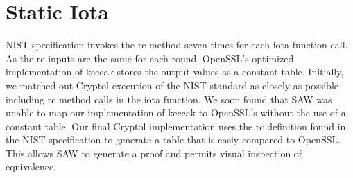 \section{Static Iota}\label{sec:iota}
NIST specification invokes the rc method seven times for each iota function call.
As the rc inputs are the same for each round, OpenSSL's optimized implementation of keccak stores 
the output values as a constant table. Initially, we matched out Cryptol execution of the NIST standard 
as closely as possible--including rc method calls in the iota function. We soon found that SAW was unable 
to map our implementation of keccak to OpenSSL's without the use of a constant table.
Our final Cryptol implementation uses the rc definition found in the NIST specification to generate a table 
that is easiy compared to OpenSSL. This allows SAW to generate a proof and permits visual inspection of equivalence.